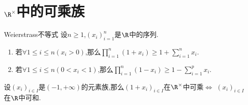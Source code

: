 \section{\texorpdfstring{$\R^{\times}$}{R*}中的可乘族}

\begin{lemma}{Weierstrass不等式}{}
	设$n\geq 1$,$\left(x_{i}\right)_{i=1}^{n}$是$\R$中的序列.
	\begin{enumerate}
		\item 若$\forall 1\leq i\leq n\left(x_{i}>0\right)$,那么$\prod\limits_{i=1}^{n}\left(1+x_{i}\right)\geq 1+\sum\limits_{i=1}^{n}x_{i}$.
		\item 若$\forall 1\leq i\leq n\left(0<x_{i}<1\right)$,那么$\prod\limits_{i=1}^{n}\left(1-x_{i}\right)\geq 1-\sum\limits_{i=1}^{p}x_{i}$.
	\end{enumerate}
\end{lemma}

\begin{theorem}{}{}
	设$\left(x_{i}\right)_{i\in I}$是$\left(-1,+\infty\right)$的元素族,那么$\left(1+x_{i}\right)_{i\in I}$在$\R^{\times}$中可乘$\iff$ $\left(x_{i}\right)_{i\in I}$在$\R$中可和.
\end{theorem}

